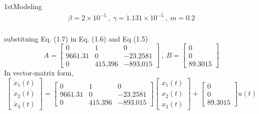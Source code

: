 \documentclass{article}
\begin{document}
\begin{homeworkProblem}{1st}{Modeling}
\begin{equation}
\begin{gathered}
        \beta = 2 \times 10^{-5} ~ , ~ \gamma = 1.131 \times 10^{-5} ~ , ~ m = 0.2
      \end{gathered}
    \end{equation}
\\substituing Eq. (1.7) in Eq. (1.6) and Eq (1.5)\\
  \begin{equation}
    A = 
    \begin{bmatrix}
      0       & 1         & 0                                         \\
      9661.31 & 0         & -23.2581                                  \\
      0       & 415.396   & -893.015
    \end{bmatrix}
    ~,~
    B = 
    \begin{bmatrix}
      0\\
      0\\
      89.3015
    \end{bmatrix}
  \end{equation}
In vector-matrix form,\\
  \begin{equation}
    \begin{bmatrix}
      \dot{x}_1(t)\\
      \dot{x}_2(t)\\
      \dot{x}_3(t)
    \end{bmatrix} 
    = 
    \begin{bmatrix}
      0       & 1         & 0                                         \\
      9661.31 & 0         & -23.2581                                  \\
      0       & 415.396   & -893.015
    \end{bmatrix}
    \begin{bmatrix}
      x_1(t)\\
      x_2(t)\\
      x_3(t)
    \end{bmatrix}
    +
    \begin{bmatrix}
      0\\
      0\\
      89.3015
    \end{bmatrix}
    u(t)
  \end{equation}
  

\end{homeworkProblem}



\end{document}
